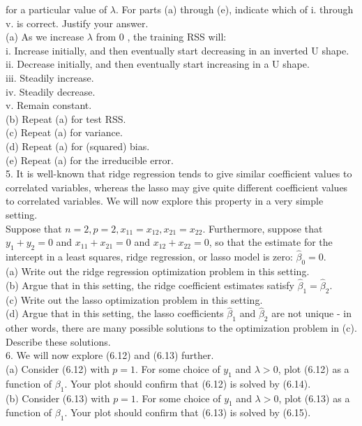 \documentclass[10pt]{article}
\begin{document}
for a particular value of $\lambda$. For parts (a) through (e), indicate which of i. through v. is correct. Justify your answer.\\
(a) As we increase $\lambda$ from 0 , the training RSS will:\\
i. Increase initially, and then eventually start decreasing in an inverted U shape.\\
ii. Decrease initially, and then eventually start increasing in a U shape.\\
iii. Steadily increase.\\
iv. Steadily decrease.\\
v. Remain constant.\\
(b) Repeat (a) for test RSS.\\
(c) Repeat (a) for variance.\\
(d) Repeat (a) for (squared) bias.\\
(e) Repeat (a) for the irreducible error.\\
5. It is well-known that ridge regression tends to give similar coefficient values to correlated variables, whereas the lasso may give quite different coefficient values to correlated variables. We will now explore this property in a very simple setting.\\
Suppose that $n=2, p=2, x_{11}=x_{12}, x_{21}=x_{22}$. Furthermore, suppose that $y_{1}+y_{2}=0$ and $x_{11}+x_{21}=0$ and $x_{12}+x_{22}=0$, so that the estimate for the intercept in a least squares, ridge regression, or lasso model is zero: $\hat{\beta}_{0}=0$.\\
(a) Write out the ridge regression optimization problem in this setting.\\
(b) Argue that in this setting, the ridge coefficient estimates satisfy $\hat{\beta}_{1}=\hat{\beta}_{2}$.\\
(c) Write out the lasso optimization problem in this setting.\\
(d) Argue that in this setting, the lasso coefficients $\hat{\beta}_{1}$ and $\hat{\beta}_{2}$ are not unique - in other words, there are many possible solutions to the optimization problem in (c). Describe these solutions.\\
6. We will now explore (6.12) and (6.13) further.\\
(a) Consider (6.12) with $p=1$. For some choice of $y_{1}$ and $\lambda>0$, plot (6.12) as a function of $\beta_{1}$. Your plot should confirm that (6.12) is solved by (6.14).\\
(b) Consider (6.13) with $p=1$. For some choice of $y_{1}$ and $\lambda>0$, plot (6.13) as a function of $\beta_{1}$. Your plot should confirm that (6.13) is solved by (6.15).\\
\end{document}
